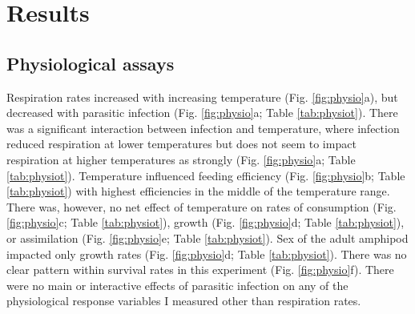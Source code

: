 \section{Results}

\subsection{Physiological assays}
Respiration rates increased with increasing temperature (Fig. \ref{fig:physio}a), but decreased with parasitic infection (Fig. \ref{fig:physio}a; Table \ref{tab:physiot}). There was a significant interaction between infection and temperature, where infection reduced respiration at lower temperatures but does not seem to impact respiration at higher temperatures as strongly (Fig. \ref{fig:physio}a; Table \ref{tab:physiot}). Temperature influenced feeding efficiency (Fig. \ref{fig:physio}b; Table \ref{tab:physiot}) with highest efficiencies in the middle of the temperature range. There was, however, no net effect of temperature on rates of consumption (Fig. \ref{fig:physio}c; Table \ref{tab:physiot}), growth (Fig. \ref{fig:physio}d; Table \ref{tab:physiot}), or assimilation (Fig. \ref{fig:physio}e; Table \ref{tab:physiot}). Sex of the adult amphipod impacted only growth rates (Fig. \ref{fig:physio}d; Table \ref{tab:physiot}). There was no clear pattern within survival rates in this experiment (Fig. \ref{fig:physio}f). There were no main or interactive effects of parasitic infection on any of the physiological response variables I measured other than respiration rates. 

